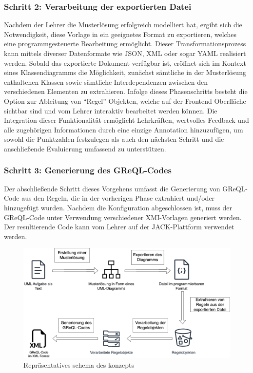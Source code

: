 \subsubsection{Schritt 2: Verarbeitung der exportierten Datei}

Nachdem der Lehrer die Musterlösung erfolgreich modelliert hat, ergibt sich die Notwendigkeit, diese Vorlage in ein geeignetes Format zu exportieren, welches eine programmgesteuerte Bearbeitung ermöglicht. Dieser Transformationsprozess kann mittels diverser Datenformate wie JSON, XML oder sogar YAML realisiert werden. Sobald das exportierte Dokument verfügbar ist, eröffnet sich im Kontext eines Klassendiagramms die Möglichkeit, zunächst sämtliche in der Musterlösung enthaltenen Klassen sowie sämtliche Interdependenzen zwischen den verschiedenen Elementen zu extrahieren. Infolge dieses Phasenschritts besteht die Option zur Ableitung von ``Regel''-Objekten, welche auf der Frontend-Oberfläche sichtbar sind und vom Lehrer interaktiv bearbeitet werden können. Die Integration dieser Funktionalität ermöglicht Lehrkräften, wertvolles Feedback und alle zugehörigen Informationen durch eine einzige Annotation hinzuzufügen, um sowohl die Punktzahlen festzulegen als auch den nächsten Schritt und die anschließende Evaluierung umfassend zu unterstützen.

\subsubsection{Schritt 3: Generierung des GReQL-Codes}

Der abschließende Schritt dieses Vorgehens umfasst die Generierung von GReQL-Code aus den Regeln, die in der vorherigen Phase extrahiert und/oder hinzugefügt wurden. Nachdem die Konfiguration abgeschlossen ist, muss der GReQL-Code unter Verwendung verschiedener XMI-Vorlagen generiert werden. Der resultierende Code kann vom Lehrer auf der JACK-Plattform verwendet werden.

\begin{figure}
	\centering
	\includegraphics[width=13cm]{images/concept}
	\caption{Repräsentatives schema des konzepts}
	\label{fig:concept}
\end{figure}

